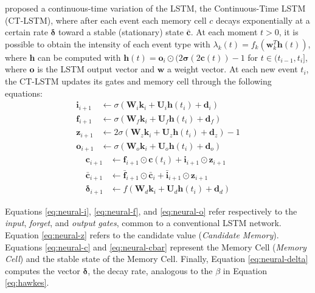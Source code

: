      proposed a continuous-time variation of the \gls{LSTM}, the Continuous-Time LSTM (CT-LSTM), where after each event each memory cell $c$ decays exponentially at a certain rate $\mathbf{\delta}$ toward a stable (stationary) state $\mathbf{\bar{c}}$. At each moment $t>0$, it is possible to obtain the intensity of each event type with $\lambda_k(t)=f_k(\mathbf{w}_k^T\mathbf{h}(t))$, where $\mathbf{h}$ can be computed with $\mathbf{h}(t)=\mathbf{o}_i \odot (2\mathbf{\sigma}(2\mathbf{c}(t))-1$ for $t \in (t_{i-1},t_i]$, where $\mathbf{o}$ is the LSTM output vector and $\mathbf{w}$ a weight vector. At each new event $t_i$, the CT-LSTM updates its gates and memory cell through the following equations:
    \begin{align}
        \mathbf{i}_{i+1} &\leftarrow \sigma(\mathbf{W}_i \mathbf{k}_i+\mathbf{U}_i \mathbf{h}(t_i)+\mathbf{d}_i) \label{eq:neural-i} \\
        \mathbf{f}_{i+1} &\leftarrow \sigma(\mathbf{W}_f \mathbf{k}_i+\mathbf{U}_f \mathbf{h}(t_i)+\mathbf{d}_f) \label{eq:neural-f} \\
        \mathbf{z}_{i+1} &\leftarrow 2\sigma(\mathbf{W}_z \mathbf{k}_i+\mathbf{U}_z \mathbf{h}(t_i)+\mathbf{d}_z) - 1 \label{eq:neural-z} \\
        \mathbf{o}_{i+1} &\leftarrow \sigma(\mathbf{W}_o \mathbf{k}_i+\mathbf{U}_o \mathbf{h}(t_i)+\mathbf{d}_o) \label{eq:neural-o}
    \end{align}
    \begin{align}
        \mathbf{c}_{i+1} &\leftarrow \mathbf{f}_{i+1} \odot \mathbf{c}(t_i)+\mathbf{i}_{i+1} \odot \mathbf{z}_{i+1} \label{eq:neural-c} \\
        \mathbf{\bar{c}}_{i+1} &\leftarrow \mathbf{\bar{f}}_{i+1} \odot \mathbf{\bar{c}}_i+\mathbf{\bar{i}}_{i+1} \odot \mathbf{z}_{i+1} \label{eq:neural-cbar} \\
        \mathbf{\delta}_{i+1} &\leftarrow f(\mathbf{W}_d \mathbf{k}_i+\mathbf{U}_d \mathbf{h}(t_i)+\mathbf{d}_d) \label{eq:neural-delta}
    \end{align}

    Equations \eqref{eq:neural-i}, \eqref{eq:neural-f}, and \eqref{eq:neural-o} refer respectively to the \textit{input}, \textit{forget}, and \textit{output} \textit{gates}, common to a conventional LSTM network. Equation \eqref{eq:neural-z} refers to the candidate value (\textit{Candidate Memory}). Equations \eqref{eq:neural-c} and \eqref{eq:neural-cbar} represent the Memory Cell (\textit{Memory Cell}) and the stable state of the Memory Cell. Finally, Equation \eqref{eq:neural-delta} computes the vector $\mathbf{\delta}$, the decay rate, analogous to the $\beta$ in Equation \eqref{eq:hawkes}.

